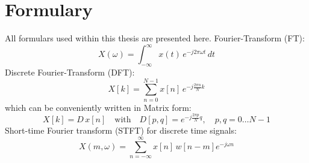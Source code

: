 \chapter{Formulary}
All formulars used within this thesis are presented here.
Fourier-Transform (FT):
\begin{equation}
    X(\omega) = \int_{-\infty}^\infty x(t) \, e^{-j 2 \pi \omega t} \,dt
\end{equation}
\noindent
Discrete Fourier-Transform (DFT):
\begin{equation}
    X[k] = \sum_{n=0}^{N-1} x[n] \, e^{-j\frac{2 \pi n}{N}k}
\end{equation}
which can be conveniently written in Matrix form:
\begin{equation}
    X[k] = D\, x[n] \quad \mathrm{with} 
    \quad D[p, q] = e^{-j\frac{2 \pi p}{N} q},
    \quad p, q = 0 \dots N-1
\end{equation}
Short-time Fourier transform (STFT) for discrete time signals:
\begin{equation}
    X(m, \omega) = \sum_{n=-\infty}^{\infty} x[n] \, w[n-m] e^{-j\omega n}
\end{equation}